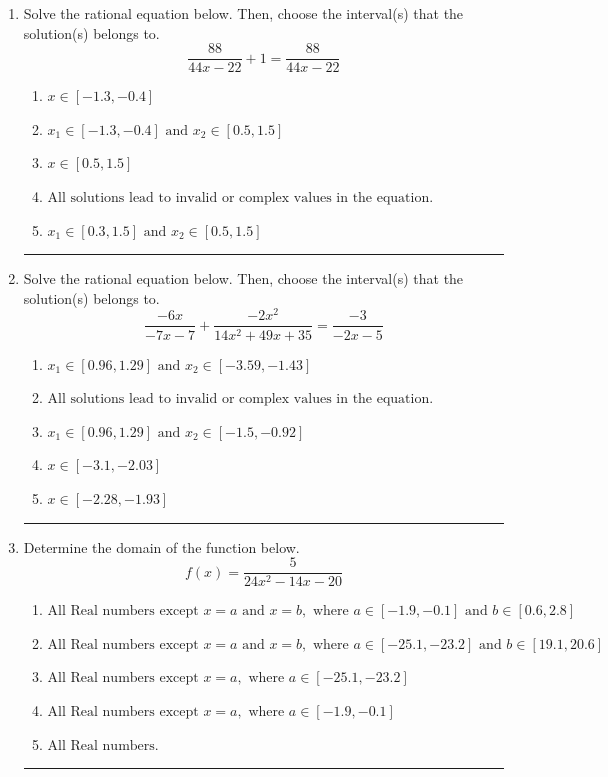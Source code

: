 \documentclass[14pt]{extbook}
\newcommand{\litem}[1]{\item#1\hspace*{-1cm}\rule{\textwidth}{0.4pt}}
\begin{document}
\begin{enumerate}
{\begin{enumerate}[label=\Alph*.]
\end{enumerate} }
\litem{
Solve the rational equation below. Then, choose the interval(s) that the solution(s) belongs to.\[ \frac{88}{44x -22} + 1 = \frac{88}{44x -22} \]\begin{enumerate}[label=\Alph*.]
\item \( x \in [-1.3,-0.4] \)
\item \( x_1 \in [-1.3, -0.4] \text{ and } x_2 \in [0.5,1.5] \)
\item \( x \in [0.5,1.5] \)
\item \( \text{All solutions lead to invalid or complex values in the equation.} \)
\item \( x_1 \in [0.3, 1.5] \text{ and } x_2 \in [0.5,1.5] \)

\end{enumerate} }
\litem{
Solve the rational equation below. Then, choose the interval(s) that the solution(s) belongs to.\[ \frac{-6x}{-7x -7} + \frac{-2x^{2}}{14x^{2} +49 x + 35} = \frac{-3}{-2x -5} \]\begin{enumerate}[label=\Alph*.]
\item \( x_1 \in [0.96, 1.29] \text{ and } x_2 \in [-3.59,-1.43] \)
\item \( \text{All solutions lead to invalid or complex values in the equation.} \)
\item \( x_1 \in [0.96, 1.29] \text{ and } x_2 \in [-1.5,-0.92] \)
\item \( x \in [-3.1,-2.03] \)
\item \( x \in [-2.28,-1.93] \)

\end{enumerate} }
\litem{
Determine the domain of the function below.\[ f(x) = \frac{5}{24x^{2} -14 x -20} \]\begin{enumerate}[label=\Alph*.]
\item \( \text{All Real numbers except } x = a \text{ and } x = b, \text{ where } a \in [-1.9, -0.1] \text{ and } b \in [0.6, 2.8] \)
\item \( \text{All Real numbers except } x = a \text{ and } x = b, \text{ where } a \in [-25.1, -23.2] \text{ and } b \in [19.1, 20.6] \)
\item \( \text{All Real numbers except } x = a, \text{ where } a \in [-25.1, -23.2] \)
\item \( \text{All Real numbers except } x = a, \text{ where } a \in [-1.9, -0.1] \)
\item \( \text{All Real numbers.} \)


\end{enumerate}}
\end{enumerate}
\end{document}
